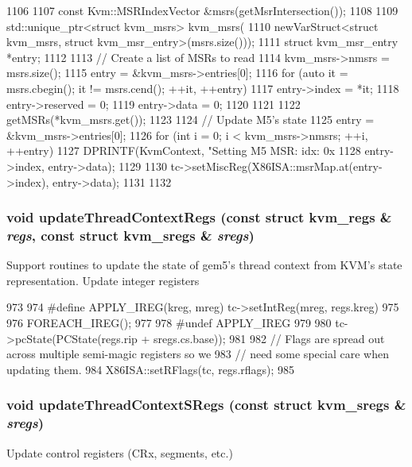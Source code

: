 \begin{DoxyCode}
1106 {
1107     const Kvm::MSRIndexVector &msrs(getMsrIntersection());
1108 
1109     std::unique_ptr<struct kvm_msrs> kvm_msrs(
1110         newVarStruct<struct kvm_msrs, struct kvm_msr_entry>(msrs.size()));
1111     struct kvm_msr_entry *entry;
1112 
1113     // Create a list of MSRs to read
1114     kvm_msrs->nmsrs = msrs.size();
1115     entry = &kvm_msrs->entries[0];
1116     for (auto it = msrs.cbegin(); it != msrs.cend(); ++it, ++entry) {
1117         entry->index = *it;
1118         entry->reserved = 0;
1119         entry->data = 0;
1120     }
1121 
1122     getMSRs(*kvm_msrs.get());
1123 
1124     // Update M5's state
1125     entry = &kvm_msrs->entries[0];
1126     for (int i = 0; i < kvm_msrs->nmsrs; ++i, ++entry) {
1127         DPRINTF(KvmContext, "Setting M5 MSR: idx: 0x%
1128                 entry->index, entry->data);
1129 
1130         tc->setMiscReg(X86ISA::msrMap.at(entry->index), entry->data);
1131     }
1132 }
\end{DoxyCode}
\hypertarget{classX86KvmCPU_a3e652bccdd2770630eb4e7bfb0b31b5e}{
\subsubsection[{updateThreadContextRegs}]{\setlength{\rightskip}{0pt plus 5cm}void updateThreadContextRegs (const struct kvm\_\-regs \& {\em regs}, \/  const struct kvm\_\-sregs \& {\em sregs})}}
\label{classX86KvmCPU_a3e652bccdd2770630eb4e7bfb0b31b5e}
Support routines to update the state of gem5's thread context from KVM's state representation. Update integer registers 


\begin{DoxyCode}
973 {
974 #define APPLY_IREG(kreg, mreg) tc->setIntReg(mreg, regs.kreg)
975 
976     FOREACH_IREG();
977 
978 #undef APPLY_IREG
979 
980     tc->pcState(PCState(regs.rip + sregs.cs.base));
981 
982     // Flags are spread out across multiple semi-magic registers so we
983     // need some special care when updating them.
984     X86ISA::setRFlags(tc, regs.rflags);
985 }
\end{DoxyCode}
\hypertarget{classX86KvmCPU_aaca63820cd695ae9a2d1bafa76f2ebf6}{
\subsubsection[{updateThreadContextSRegs}]{\setlength{\rightskip}{0pt plus 5cm}void updateThreadContextSRegs (const struct kvm\_\-sregs \& {\em sregs})}}
\label{classX86KvmCPU_aaca63820cd695ae9a2d1bafa76f2ebf6}
Update control registers (CRx, segments, etc.) 


